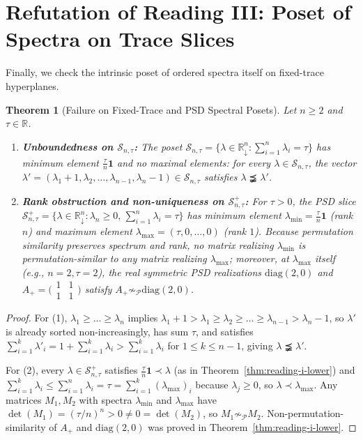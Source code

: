 \documentclass[11pt]{article}
\newtheorem{theorem}{Theorem}[section]
\theoremstyle{definition}
\theoremstyle{remark}
\newcommand{\R}{\mathbb{R}}
\newcommand{\diag}{\mathrm{diag}}
\newcommand{\Ones}{\mathbf{1}}
\begin{document}
\section{Refutation of Reading III: Poset of Spectra on Trace Slices}
\label{sec:reading-iii}

Finally, we check the intrinsic poset of ordered spectra itself on fixed-trace
hyperplanes.

\begin{theorem}[Failure on Fixed-Trace and PSD Spectral Posets]
\label{thm:reading-iii}
Let $n \ge 2$ and $\tau \in \R$.
\begin{enumerate}
  \item \textbf{Unboundedness on $\mathcal{S}_{n,\tau}$:} The poset
  $\mathcal{S}_{n,\tau} = \{ \lambda \in \R_\downarrow^n : \sum_{i=1}^n \lambda_i = \tau \}$
  has minimum element $\frac{\tau}{n}\Ones$ and \emph{no} maximal elements: for
  every $\lambda \in \mathcal{S}_{n,\tau}$, the vector
  $\lambda' = (\lambda_1 + 1, \lambda_2, \dots, \lambda_{n-1}, \lambda_n - 1) \in
  \mathcal{S}_{n,\tau}$ satisfies $\lambda \precneqq \lambda'$.
  \item \textbf{Rank obstruction and non-uniqueness on $\mathcal{S}_{n,\tau}^+$:}
  For $\tau > 0$, the PSD slice
  $\mathcal{S}_{n,\tau}^+ = \{ \lambda \in \R_\downarrow^n : \lambda_n \ge 0,\,
  \sum_{i=1}^n \lambda_i = \tau \}$ has minimum element
  $\lambda_{\min} = \frac{\tau}{n}\Ones$ (rank $n$) and maximum element
  $\lambda_{\max} = (\tau,0,\dots,0)$ (rank $1$). Because permutation similarity
  preserves spectrum and rank, no matrix realizing $\lambda_{\min}$ is
  permutation-similar to any matrix realizing $\lambda_{\max}$; moreover, at
  $\lambda_{\max}$ itself (e.g., $n = 2, \tau = 2$), the real symmetric PSD
  realizations $\diag(2,0)$ and $A_+ = \bigl(\begin{smallmatrix} 1 & 1 \\ 1 & 1 \end{smallmatrix}\bigr)$
  satisfy $A_+ \not\sim_{\mathcal{P}} \diag(2,0)$.
\end{enumerate}
\end{theorem}
\begin{proof}
For (1), $\lambda_1 \ge \dots \ge \lambda_n$ implies
$\lambda_1 + 1 > \lambda_1 \ge \lambda_2 \ge \dots \ge \lambda_{n-1} > \lambda_n - 1$,
so $\lambda'$ is already sorted non-increasingly, has sum $\tau$, and satisfies
$\sum_{i=1}^k \lambda'_i = 1 + \sum_{i=1}^k \lambda_i > \sum_{i=1}^k \lambda_i$
for $1 \le k \le n-1$, giving $\lambda \precneqq \lambda'$.

For (2), every $\lambda \in \mathcal{S}_{n,\tau}^+$ satisfies
$\frac{\tau}{n}\Ones \prec \lambda$ (as in Theorem~\ref{thm:reading-i-lower}) and
$\sum_{i=1}^k \lambda_i \le \sum_{i=1}^n \lambda_i = \tau = \sum_{i=1}^k (\lambda_{\max})_i$
because $\lambda_j \ge 0$, so $\lambda \prec \lambda_{\max}$. Any matrices $M_1, M_2$
with spectra $\lambda_{\min}$ and $\lambda_{\max}$ have $\det(M_1) = (\tau/n)^n > 0
\neq 0 = \det(M_2)$, so $M_1 \not\sim_{\mathcal{P}} M_2$. Non-permutation-similarity
of $A_+$ and $\diag(2,0)$ was proved in Theorem~\ref{thm:reading-i-lower}.
\end{proof}
\end{document}
